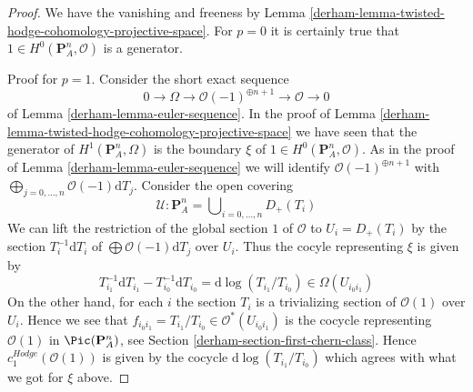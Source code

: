 \begin{proof}

We have the vanishing and freeness by
Lemma \ref{derham-lemma-twisted-hodge-cohomology-projective-space}.
For $p = 0$ it is certainly true that
$1 \in H^0(\mathbf{P}^n_A, \mathcal{O})$ is a generator.

\medskip\noindent
Proof for $p = 1$. Consider the short exact sequence
$$
0 \to \Omega \to \mathcal{O}(-1)^{\oplus n + 1} \to \mathcal{O} \to 0
$$
of Lemma \ref{derham-lemma-euler-sequence}. In the proof of
Lemma \ref{derham-lemma-twisted-hodge-cohomology-projective-space}
we have seen that the generator of $H^1(\mathbf{P}^n_A, \Omega)$
is the boundary $\xi$ of $1 \in H^0(\mathbf{P}^n_A, \mathcal{O})$.
As in the proof of Lemma \ref{derham-lemma-euler-sequence} we will identify
$\mathcal{O}(-1)^{\oplus n + 1}$ with
$\bigoplus_{j = 0, \ldots, n} \mathcal{O}(-1)\text{d}T_j$.
Consider the open covering
$$
\mathcal{U} :
\mathbf{P}^n_A =
\bigcup\nolimits_{i = 0, \ldots, n} D_{+}(T_i)
$$
We can lift the restriction of the global section $1$ of $\mathcal{O}$
to $U_i = D_+(T_i)$ by the section $T_i^{-1} \text{d}T_i$ of
$\bigoplus \mathcal{O}(-1)\text{d}T_j$ over $U_i$. Thus the cocyle
representing $\xi$ is given by
$$
T_{i_1}^{-1} \text{d}T_{i_1} - T_{i_0}^{-1} \text{d}T_{i_0} =
\text{d}\log(T_{i_1}/T_{i_0}) \in \Omega(U_{i_0i_1})
$$
On the other hand, for each $i$ the section $T_i$ is a trivializing
section of $\mathcal{O}(1)$ over $U_i$. Hence we see that
$f_{i_0i_1} = T_{i_1}/T_{i_0} \in \mathcal{O}^*(U_{i_0i_1})$
is the cocycle representing $\mathcal{O}(1)$ in $\Pic(\mathbf{P}^n_A)$,
see Section \ref{derham-section-first-chern-class}.
Hence $c_1^{Hodge}(\mathcal{O}(1))$
is given by the cocycle $\text{d}\log(T_{i_1}/T_{i_0})$
which agrees with what we got for $\xi$ above.


\end{proof}
